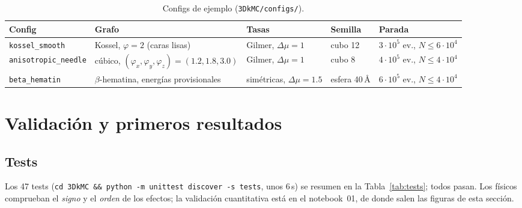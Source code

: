 \documentclass[11pt,a4paper]{article}
\newcommand{\code}[1]{\texttt{#1}}
\newcommand{\dmu}{\Delta\mu}
\newcommand{\bh}{$\beta$-hematina}
\begin{document}
\begin{table}[h]
\centering\small
\caption{Configs de ejemplo (\code{3DkMC/configs/}).}
\label{tab:configs}
\begin{tabularx}{\linewidth}{@{}lYlll@{}}
\toprule
Config & Grafo & Tasas & Semilla & Parada\\
\midrule
\code{kossel\_smooth} & Kossel, $\varphi=2$ (caras lisas) & Gilmer, $\dmu=1$ & cubo 12 & $3\cdot10^5$ ev., $N\le6\cdot10^4$\\
\code{anisotropic\_needle} & cúbico, $(\varphi_x,\varphi_y,\varphi_z)=(1.2,1.8,3.0)$ & Gilmer, $\dmu=1$ & cubo 8 & $4\cdot10^5$ ev., $N\le4\cdot10^4$\\
\code{beta\_hematin} & \bh{}, energías provisionales & simétricas, $\dmu=1.5$ & esfera 40\,Å & $6\cdot10^5$ ev., $N\le4\cdot10^4$\\
\bottomrule
\end{tabularx}
\end{table}

\section{Validación y primeros resultados}
\label{sec:valid}

\subsection{Tests}

Los 47 tests (\code{cd 3DkMC \&\& python -m unittest discover -s tests}, unos 6\,s) se resumen en la
Tabla~\ref{tab:tests}; todos pasan. Los físicos comprueban el \emph{signo} y el \emph{orden} de los
efectos; la validación cuantitativa está en el notebook~01, de donde salen las figuras de esta sección.
\end{document}
